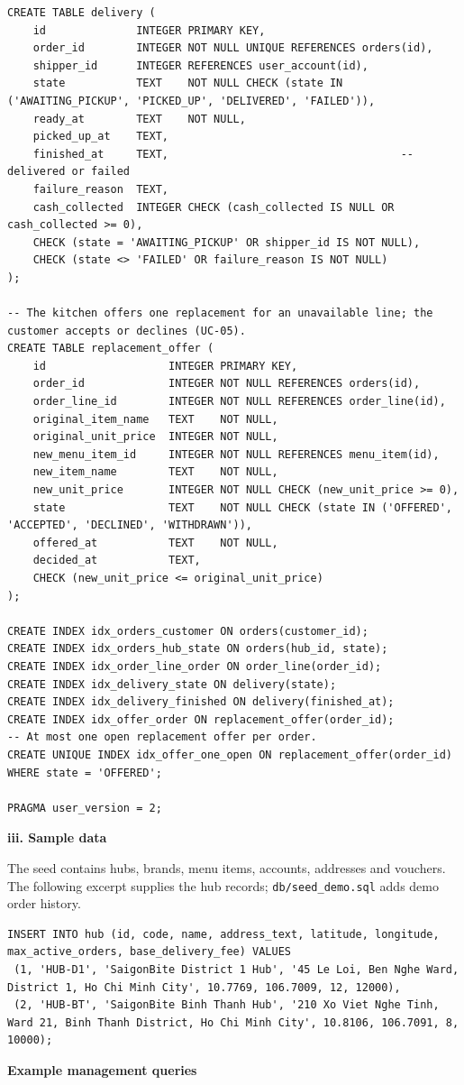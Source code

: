\begin{lstlisting}
CREATE TABLE delivery (
    id              INTEGER PRIMARY KEY,
    order_id        INTEGER NOT NULL UNIQUE REFERENCES orders(id),
    shipper_id      INTEGER REFERENCES user_account(id),
    state           TEXT    NOT NULL CHECK (state IN ('AWAITING_PICKUP', 'PICKED_UP', 'DELIVERED', 'FAILED')),
    ready_at        TEXT    NOT NULL,
    picked_up_at    TEXT,
    finished_at     TEXT,                                    -- delivered or failed
    failure_reason  TEXT,
    cash_collected  INTEGER CHECK (cash_collected IS NULL OR cash_collected >= 0),
    CHECK (state = 'AWAITING_PICKUP' OR shipper_id IS NOT NULL),
    CHECK (state <> 'FAILED' OR failure_reason IS NOT NULL)
);

-- The kitchen offers one replacement for an unavailable line; the customer accepts or declines (UC-05).
CREATE TABLE replacement_offer (
    id                   INTEGER PRIMARY KEY,
    order_id             INTEGER NOT NULL REFERENCES orders(id),
    order_line_id        INTEGER NOT NULL REFERENCES order_line(id),
    original_item_name   TEXT    NOT NULL,
    original_unit_price  INTEGER NOT NULL,
    new_menu_item_id     INTEGER NOT NULL REFERENCES menu_item(id),
    new_item_name        TEXT    NOT NULL,
    new_unit_price       INTEGER NOT NULL CHECK (new_unit_price >= 0),
    state                TEXT    NOT NULL CHECK (state IN ('OFFERED', 'ACCEPTED', 'DECLINED', 'WITHDRAWN')),
    offered_at           TEXT    NOT NULL,
    decided_at           TEXT,
    CHECK (new_unit_price <= original_unit_price)
);

CREATE INDEX idx_orders_customer ON orders(customer_id);
CREATE INDEX idx_orders_hub_state ON orders(hub_id, state);
CREATE INDEX idx_order_line_order ON order_line(order_id);
CREATE INDEX idx_delivery_state ON delivery(state);
CREATE INDEX idx_delivery_finished ON delivery(finished_at);
CREATE INDEX idx_offer_order ON replacement_offer(order_id);
-- At most one open replacement offer per order.
CREATE UNIQUE INDEX idx_offer_one_open ON replacement_offer(order_id) WHERE state = 'OFFERED';

PRAGMA user_version = 2;
\end{lstlisting}
\textbf{iii. Sample data}

The seed contains hubs, brands, menu items, accounts, addresses and vouchers. The following excerpt supplies the hub records; \texttt{db/\allowbreak{}seed\_\allowbreak{}demo.\allowbreak{}sql} adds demo order history.

\begin{lstlisting}
INSERT INTO hub (id, code, name, address_text, latitude, longitude, max_active_orders, base_delivery_fee) VALUES
 (1, 'HUB-D1', 'SaigonBite District 1 Hub', '45 Le Loi, Ben Nghe Ward, District 1, Ho Chi Minh City', 10.7769, 106.7009, 12, 12000),
 (2, 'HUB-BT', 'SaigonBite Binh Thanh Hub', '210 Xo Viet Nghe Tinh, Ward 21, Binh Thanh District, Ho Chi Minh City', 10.8106, 106.7091, 8, 10000);
\end{lstlisting}
\textbf{Example management queries}

